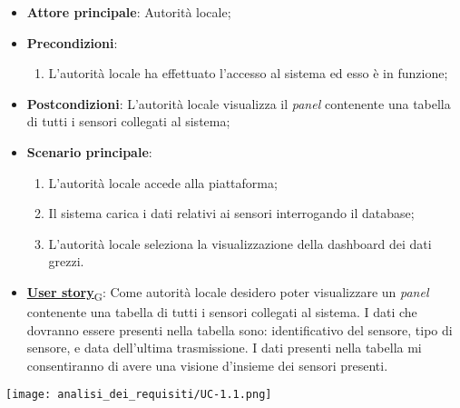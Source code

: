 \begin{itemize}
	\item \textbf{Attore principale}: Autorità locale;
	\item \textbf{Precondizioni}:
	      \begin{enumerate}
		      \item L'autorità locale ha effettuato l'accesso al sistema ed esso è in funzione;
	      \end{enumerate}
	\item \textbf{Postcondizioni}:
	      L'autorità locale visualizza il \textit{panel} contenente una tabella di tutti i sensori collegati al sistema;

	\item \textbf{Scenario principale}:
	      \begin{enumerate}
		      \item L'autorità locale accede alla piattaforma;
		      \item Il sistema carica i dati relativi ai sensori interrogando il database;
		      \item L'autorità locale seleziona la visualizzazione della dashboard dei dati grezzi.
	      \end{enumerate}
	\item \href{https://7last.github.io/docs/rtb/documentazione-interna/glossario\#user-story}{\textbf{User story}\textsubscript{G}}: Come autorità locale desidero poter visualizzare un \textit{panel} contenente una tabella di tutti i sensori collegati al sistema.
	      I dati che dovranno essere presenti nella tabella sono: identificativo del sensore, tipo di sensore,
	      e data dell'ultima trasmissione. I dati presenti nella tabella mi consentiranno di avere una visione d'insieme dei sensori presenti.

\end{itemize}
\begin{center}
	\texttt{[image: analisi\_dei\_requisiti/UC-1.1.png]}
\end{center}


